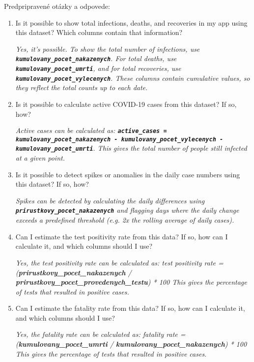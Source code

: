 Predpripravené otázky a odpovede:
\begin{enumerate}
\item Is it possible to show total infections, deaths, and recoveries in my app using this dataset? Which columns contain that information?

\textit{Yes, it's possible. To show the total number of infections, use \textbf{\texttt{ku\-mu\-lo\-va\-ny\_po\-cet\_na\-ka\-ze\-nych}}. For total deaths, use \textbf{\texttt{kumulovany\_pocet\_umrti}}, and for total recoveries, use \textbf{\texttt{kumulovany\_pocet\_vylecenych}}. These columns contain cumulative values, so they reflect the total counts up to each date.}

\item Is it possible to calculate active COVID-19 cases from this dataset? If so, how?

\textit{Active cases can be calculated as: \newline\textbf{\texttt{active\_cases = ku\-mu\-lo\-va\-ny\_po\-cet\_na\-ka\-ze\-nych \newline- ku\-mu\-lo\-va\-ny\_po\-cet\_vy\-le\-ce\-nych \newline- ku\-mu\-lo\-va\-ny\_po\-cet\_u\-mr\-ti}}. This gives the total number of people still infected at a given point.}

\item Is it possible to detect spikes or anomalies in the daily case numbers using this dataset? If so, how?

\textit{Spikes can be detected by calculating the daily differences using \textbf{\texttt{pri\-rust\-ko\-vy\_po\-cet\_na\-ka\-ze\-nych}} and flagging days where the daily change exceeds a predefined threshold (e.g. 2x the rolling average of daily cases).}

\item Can I estimate the test positivity rate from this data? If so, how can I calculate it, and which columns should I use?

\textit{Yes, the test positivity rate can be calculated as: test positivity rate = (\textbf{\textit{pri\-rust\-ko\-vy\_po\-cet\_na\-ka\-ze\-nych}} / \textbf{\textit{pri\-rust\-ko\-vy\_po\-cet\_pro\-ve\-de\-nych\_testu}}) * 100 This gives the percentage of tests that resulted in positive cases.}

\item Can I estimate the fatality rate from this data? If so, how can I calculate it, and which columns should I use?

\textit{Yes, the fatality rate can be calculated as: fatality rate = (\textbf{\textit{ku\-mu\-lo\-va\-ny\_po\-cet\_u\-mr\-ti}} / \textbf{\textit{ku\-mu\-lo\-va\-ny\_po\-cet\_na\-ka\-ze\-nych}}) * 100 This gives the percentage of tests that resulted in positive cases.}


\end{enumerate}
